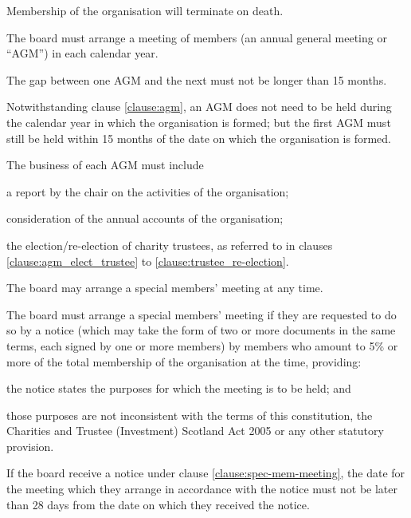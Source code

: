 ﻿\documentclass[a4paper,11pt,onecolumn ]{article}
\begin{document}

\begin{legal}
\item Membership of the organisation will terminate on death.
\end{legal}


\begin{legal}
\item \label{clause:agm} The board must arrange a meeting of members (an annual general meeting or ``AGM'') in each calendar year.
\item The gap between one AGM and the next must not be longer than 15 months.
\item Notwithstanding clause \ref{clause:agm}, an AGM does not need to be held during the calendar year in which the organisation is formed; but the first AGM must still be held within 15 months of the date on which the organisation is formed. 
\item The business of each AGM must include
    \begin{legal}
    \item a report by the chair on the activities of the organisation;
    \item consideration of the annual accounts of the organisation;
    \item the election/re-election of charity trustees, as referred to in clauses \ref{clause:agm_elect_trustee} to \ref{clause:trustee_re-election}.
    \end{legal}
\item The board may arrange a special members' meeting at any time.
\end{legal}


\begin{legal}
\item \label{clause:spec-mem-meeting} The board must arrange a special members’ meeting if they are requested to do so by a notice (which may take the form of two or more documents in the same terms, each signed by one or more members) by members who amount to 5\% or more of the total membership of the organisation at the time, providing:
    \begin{legal}
    \item the notice states the purposes for which the meeting is to be held; and
    \item those purposes are not inconsistent with the terms of this constitution, the Charities and Trustee (Investment) Scotland Act 2005 or any other statutory provision.
    \end{legal}
\item If the board receive a notice under clause \ref{clause:spec-mem-meeting}, the date for the meeting which they arrange in accordance with the notice must not be later than 28 days from the date on which they received the notice.
\end{legal}
\end{document}
